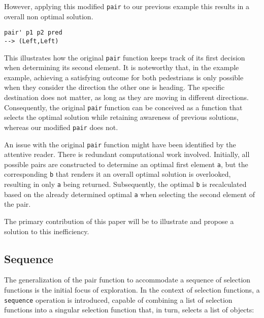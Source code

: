 \documentclass[runningheads]{llncs}
\begin{document}
However, applying this modified \texttt{pair\textquotesingle{}} to our
previous example this results in a overall non optimal solution.

\begin{verbatim}
pair' p1 p2 pred
--> (Left,Left)
\end{verbatim}

This illustrates how the original \texttt{pair} function keeps track of
its first decision when determining its second element. It is noteworthy
that, in the example example, achieving a satisfying outcome for both
pedestrians is only possible when they consider the direction the other
one is heading. The specific destination does not matter, as long as
they are moving in different directions. Consequently, the original
\texttt{pair} function can be conceived as a function that selects the
optimal solution while retaining awareness of previous solutions,
whereas our modified \texttt{pair\textquotesingle{}} does not.

An issue with the original \texttt{pair} function might have been
identified by the attentive reader. There is redundant computational
work involved. Initially, all possible pairs are constructed to
determine an optimal first element \texttt{a}, but the corresponding
\texttt{b} that renders it an overall optimal solution is overlooked,
resulting in only \texttt{a} being returned. Subsequently, the optimal
\texttt{b} is recalculated based on the already determined optimal
\texttt{a} when selecting the second element of the pair.

The primary contribution of this paper will be to illustrate and propose
a solution to this inefficiency.

\subsection{Sequence}\label{sequence}

The generalization of the pair function to accommodate a sequence of
selection functions is the initial focus of exploration. In the context
of selection functions, a \texttt{sequence} operation is introduced,
capable of combining a list of selection functions into a singular
selection function that, in turn, selects a list of objects:

\begin{Shaded}
\begin{Highlighting}[]
\OtherTok{ ::}\NormalTok{ [}\NormalTok{ r a] }\OtherTok{{-}\textgreater{}} 
\OtherTok{=}\NormalTok{ []}
\OperatorTok{:}\OtherTok{=}\OperatorTok{:}
\OtherTok{=}\OtherTok{{-}\textgreater{}}\OperatorTok{:} \OperatorTok{:}\NormalTok{))))}
\OtherTok{=} \OperatorTok{:}\NormalTok{))}
\end{Highlighting}
\end{Shaded}
\end{document}
